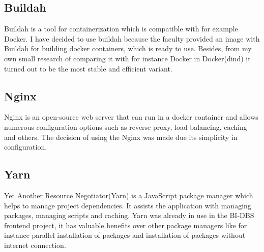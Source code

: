 \subsection{Buildah} Buildah is a tool for containerization which is compatible with for example Docker. I have decided to use buildah because the faculty provided an image with Buildah for building docker containers, which is ready to use. Besides, from my own small research of comparing it with for instance Docker in Docker(dind) it turned out to be the most stable and efficient variant. \cite{buildah}


\subsection{Nginx} Nginx is an open-source web server that can run in a docker container and allows numerous configuration options such as reverse proxy, load balancing, caching and others. The decision of using the Nginx was made due its simplicity in configuration. \cite{nginx, nginx-2}


\subsection{Yarn} Yet Another Resource Negotiator(Yarn) is a JavaScript package manager which helps to manage project dependencies. It assists the application with managing packages, managing scripts and caching. Yarn was already in use in the BI-DBS frontend project, it has valuable benefits over other package managers like for instance parallel installation of packages and installation of packages without internet connection. \cite{yarn, yarn-2}
